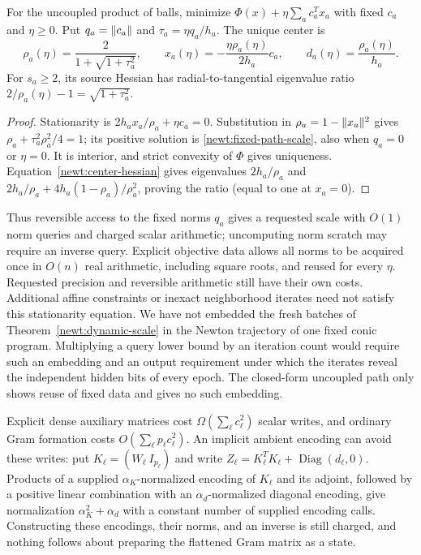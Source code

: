 \begin{proposition}
\label{newt:fixed-scale}
For the uncoupled product of balls, minimize
$\Phi(x)+\eta\sum_a c_a^Tx_a$ with fixed $c_a$ and $\eta\geq0$.
Put $q_a=\lVert c_a\rVert$ and $\tau_a=\eta q_a/h_a$.  The unique center is
\begin{equation}\label{newt:fixed-path-scale}
 \rho_a(\eta)=\frac{2}{1+\sqrt{1+\tau_a^2}},\qquad
 x_a(\eta)=-\frac{\eta\rho_a(\eta)}{2h_a}c_a,\qquad
 d_a(\eta)=\frac{\rho_a(\eta)}{h_a}.
\end{equation}
For $s_a\geq2$, its source Hessian has radial-to-tangential eigenvalue ratio
$2/\rho_a(\eta)-1=\sqrt{1+\tau_a^2}$.
\end{proposition}
\begin{proof}
Stationarity is $2h_ax_a/\rho_a+\eta c_a=0$.  Substitution in
$\rho_a=1-\lVert x_a\rVert^2$ gives
$\rho_a+\tau_a^2\rho_a^2/4=1$; its positive solution is
\eqref{newt:fixed-path-scale}, also when $q_a=0$ or $\eta=0$.
It is interior, and strict convexity of $\Phi$ gives uniqueness.
Equation~\eqref{newt:center-hessian} gives eigenvalues $2h_a/\rho_a$
and $2h_a/\rho_a+4h_a(1-\rho_a)/\rho_a^2$, proving the ratio
(equal to one at $x_a=0$).
\end{proof}

Thus reversible access to the fixed norms $q_a$ gives a requested scale
with $O(1)$ norm queries and charged scalar arithmetic;
uncomputing norm scratch may require an inverse query.  Explicit objective
data allows all norms to be acquired once in $O(n)$ real arithmetic,
including square roots, and reused for every $\eta$.
Requested precision and reversible arithmetic still have their own costs.
Additional affine constraints or inexact neighborhood iterates need not
satisfy this stationarity equation.  We have not embedded the fresh
batches of Theorem~\ref{newt:dynamic-scale} in the Newton trajectory of
one fixed conic program.  Multiplying a query lower bound by an
iteration count would require such an embedding and an output
requirement under which the iterates reveal the independent hidden bits
of every epoch.  The closed-form uncoupled path only shows reuse of fixed
data and gives no such embedding.

Explicit dense auxiliary matrices cost $\Omega(\sum_\ell c_\ell^2)$
scalar writes, and ordinary Gram formation costs
$O(\sum_\ell p_\ell c_\ell^2)$.  An implicit ambient encoding can
avoid these writes: put $K_\ell=(W_\ell\ I_{p_\ell})$ and write
$Z_\ell=K_\ell^TK_\ell+\operatorname{Diag}(d_\ell,0)$.
Products of a supplied $\alpha_K$-normalized encoding of $K_\ell$ and
its adjoint, followed by a positive linear combination with an
$\alpha_d$-normalized diagonal encoding, give normalization
$\alpha_K^2+\alpha_d$ with a constant number of supplied encoding calls.  Constructing these encodings, their norms, and an inverse is still
charged, and nothing follows about preparing the flattened Gram matrix as
a state.

